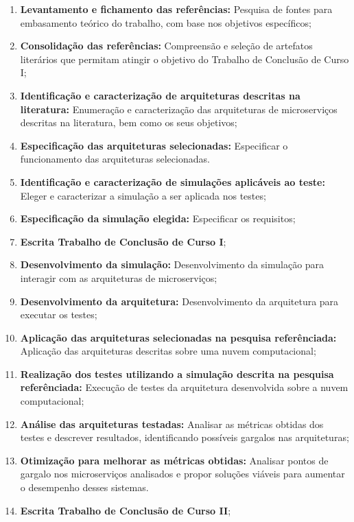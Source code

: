 \begin{enumerate}
  \item \textbf{Levantamento e fichamento das referências:} Pesquisa de fontes para embasamento teórico do trabalho, com base nos objetivos específicos;

  \item \textbf{Consolidação das referências:} Compreensão e seleção de artefatos literários que permitam atingir o objetivo do Trabalho de Conclusão de Curso I;

  \item \textbf{Identificação e caracterização de arquiteturas descritas na literatura:} Enumeração e caracterização das arquiteturas de microserviços descritas na literatura, bem como os seus objetivos;

  \item \textbf{Especificação das arquiteturas selecionadas:} Especificar o funcionamento das arquiteturas selecionadas.

  \item \textbf{Identificação e caracterização de simulações aplicáveis ao teste:} Eleger e caracterizar a simulação a ser aplicada nos testes;

  \item \textbf{Especificação da simulação elegida:} Especificar os requisitos;

  \item \textbf{Escrita Trabalho de Conclusão de Curso I};

  \item \textbf{Desenvolvimento da simulação:} Desenvolvimento da simulação para interagir com as arquiteturas de microserviços;

  \item \textbf{Desenvolvimento da arquitetura:} Desenvolvimento da arquitetura para executar os testes;

  \item \textbf{Aplicação das arquiteturas selecionadas na pesquisa referênciada:} Aplicação das arquiteturas descritas sobre uma nuvem computacional;

  \item \textbf{Realização dos testes utilizando a simulação descrita na pesquisa referênciada:} Execução de testes da arquitetura desenvolvida sobre a nuvem computacional;

  \item \textbf{Análise das arquiteturas testadas:} Analisar as métricas obtidas dos testes e descrever resultados, identificando possíveis gargalos nas arquiteturas;

  \item \textbf{Otimização para melhorar as métricas obtidas:} Analisar pontos de gargalo nos microserviços analisados e propor soluções viáveis para aumentar o desempenho desses sistemas.

  \item \textbf{Escrita Trabalho de Conclusão de Curso II};
\end{enumerate}
